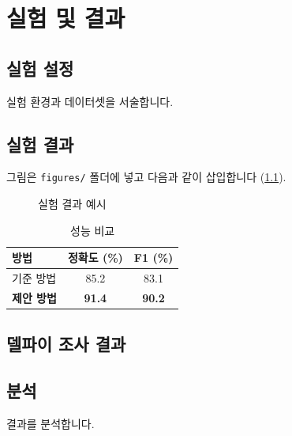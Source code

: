 \chapter{실험 및 결과}\label{ch:experiments}

\section{실험 설정}
실험 환경과 데이터셋을 서술합니다.

\section{실험 결과}
그림은 \texttt{figures/} 폴더에 넣고 다음과 같이 삽입합니다 (\cref{fig:example}).

\begin{figure}[htbp]
  \centering
  \caption{실험 결과 예시}\label{fig:example}
\end{figure}

\begin{table}[htbp]
  \centering
  \caption{성능 비교}\label{tab:results}
  \begin{tabular}{lS[table-format=2.1]S[table-format=2.1]}
    \toprule
    {방법} & {정확도 (\si{\percent})} & {F1 (\si{\percent})} \\
    \midrule
    기준 방법 & 85.2 & 83.1 \\
    \textbf{제안 방법} & \bfseries 91.4 & \bfseries 90.2 \\
    \bottomrule
  \end{tabular}
\end{table}

\section{델파이 조사 결과}
  {}
  {}

\section{분석}
결과를 분석합니다.
